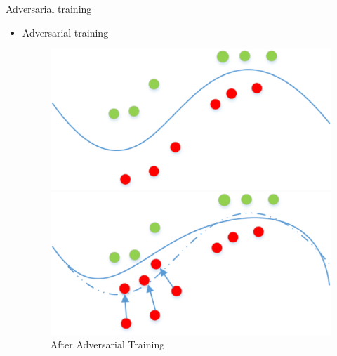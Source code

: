 \documentclass[
 size=12pt,
 paper=smartboard, %
 mode=present, %
 display=slides, %
style=tuliplab,
pauseslide,
fleqn,leqno]{powerdot}
\begin{document}
\begin{slide}{Adversarial training}
  \begin{itemize}
    \item Adversarial training \cite{gong2017adversarial} \pause
    \begin{figure}[h]
      \begin{minipage}[t]{0.45\linewidth}
        \centering
        \includegraphics[width=1.0\textwidth]{figures3/beforeat.eps}
        \caption{Before Adversarial Training}
        \label{fig:before-at}
      \end{minipage} 
      \pause
      \begin{minipage}[t]{0.45\linewidth}
        \centering
        \includegraphics[width=1.0\textwidth]{figures3/afterat.eps}
        \caption{After Adversarial Training}
        \label{fig:after-at}
      \end{minipage}
    \end{figure}
  \end{itemize}
\end{slide}
\end{document}
